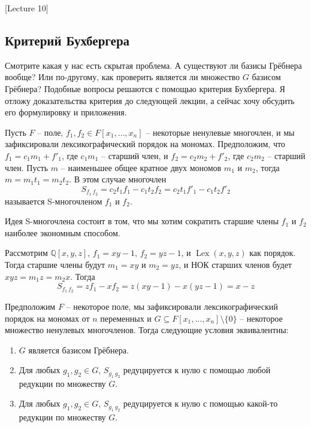 [Lecture 10]


\subsection{Критерий Бухбергера}

Смотрите какая у нас есть  скрытая проблема.
А существуют ли базисы Грёбнера вообще?
Или по-другому, как проверить является ли множество $G$ базисом Грёбнера?
Подобные вопросы решаются с помощью критерия Бухбергера.
Я отложу доказательства критерия до следующей лекции, а сейчас хочу обсудить его формулировку и приложения.

\begin{definition}
Пусть $F$ -- поле, $f_1,f_2\in F[x_1,\ldots,x_n]$ -- некоторые ненулевые многочлен, и мы зафиксировали лексикографический порядок на мономах.
Предположим, что $f_1 = c_1 m_1 + f'_1$, где $c_1m_1$ -- старший член, и $f_2 = c_2 m_2 + f'_2$, где $c_2m_2$ -- старший член.
Пусть $m$ -- наименьшее общее кратное двух мономов  $m_1$ и $m_2$, тогда $m = m_1 t_1 = m_2 t_2$.
В этом случае многочлен
\[
S_{f_1\,f_2} = c_2t_1 f_1 - c_1 t_2 f_2 = c_2t_1 f'_1 - c_1 t_2 f'_2
\]
называется S-многочленом $f_1$ и $f_2$.
\end{definition}

Идея S-многочлена состоит в том, что мы хотим сократить старшие члены $f_1$ и $f_2$ наиболее экономным способом.

\begin{example}
\label{example::SPoly}
Рассмотрим $\mathbb Q[x, y, z]$, $f_1 = xy - 1$, $f_2 = yz - 1$, и $\operatorname{Lex}(x, y, z)$ как порядок.
Тогда старшие члены будут $m_1 = xy$ и $m_2 = yz$, и НОК старших членов будет $xyz = m_1 z = m_2 x$.
Тогда
\[
S_{f_1\,f_2} = z f_1 - x f_2 = z(xy - 1) - x(yz - 1) = x-z
\]
\end{example}


\begin{claim}
Предположим $F$ -- некоторое поле, мы зафиксировали лексикографический порядок на мономах от $n$ переменных и $G\subseteq F[x_1,\ldots,x_n]\setminus\{0\}$ -- некоторое множество ненулевых многочленов.
Тогда следующие условия эквивалентны:
\begin{enumerate}
\item $G$ является базисом Грёбнера.

\item Для любых $g_1,g_2\in G$, $S_{g_1\,g_2}$ редуцируется к нулю с помощью любой редукции по множеству $G$.

\item Для любых $g_1,g_2\in G$, $S_{g_1\,g_2}$ редуцируется к нулю с помощью какой-то редукции по множеству $G$.
\end{enumerate}
\end{claim}

